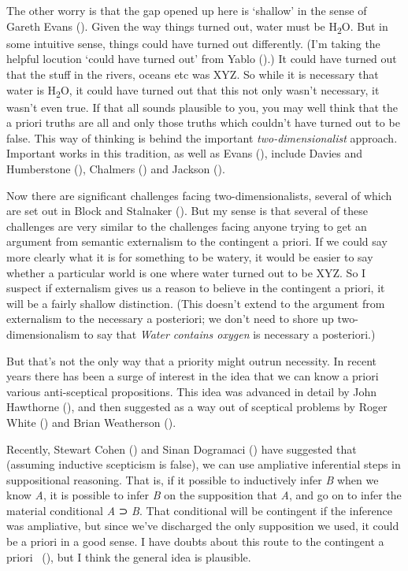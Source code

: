 \documentclass[
  10pt,
  letterpaper,
  DIV=11,
  numbers=noendperiod,
  twoside]{scrartcl}
\begin{document}
The other worry is that the gap opened up here is `shallow' in the sense
of Gareth Evans (). Given the way things
turned out, water must be H\textsubscript{2}O. But in some intuitive
sense, things could have turned out differently. (I'm taking the helpful
locution `could have turned out' from Yablo
().) It could have turned out that the
stuff in the rivers, oceans etc was XYZ. So while it is necessary that
water is H\textsubscript{2}O, it could have turned out that this not
only wasn't necessary, it wasn't even true. If that all sounds plausible
to you, you may well think that the a priori truths are all and only
those truths which couldn't have turned out to be false. This way of
thinking is behind the important \emph{two-dimensionalist} approach.
Important works in this tradition, as well as Evans
(), include Davies and Humberstone
(), Chalmers
() and Jackson
().

Now there are significant challenges facing two-dimensionalists, several
of which are set out in Block and Stalnaker
(). But my sense is that several of
these challenges are very similar to the challenges facing anyone trying
to get an argument from semantic externalism to the contingent a priori.
If we could say more clearly what it is for something to be watery, it
would be easier to say whether a particular world is one where water
turned out to be XYZ. So I suspect if externalism gives us a reason to
believe in the contingent a priori, it will be a fairly shallow
distinction. (This doesn't extend to the argument from externalism to
the necessary a posteriori; we don't need to shore up two-dimensionalism
to say that \emph{Water contains oxygen} is necessary a posteriori.)

But that's not the only way that a priority might outrun necessity. In
recent years there has been a surge of interest in the idea that we can
know a priori various anti-sceptical propositions. This idea was
advanced in detail by John Hawthorne
(), and then suggested as a way out of
sceptical problems by Roger White () and
Brian Weatherson ().

Recently, Stewart Cohen () and Sinan
Dogramaci () have suggested that
(assuming inductive scepticism is false), we can use ampliative
inferential steps in suppositional reasoning. That is, if it possible to
inductively infer \emph{B} when we know \emph{A}, it is possible to
infer \emph{B} on the supposition that \emph{A}, and go on to infer the
material conditional \emph{A} ⊃ \emph{B}. That conditional will be
contingent if the inference was ampliative, but since we've discharged
the only supposition we used, it could be a priori in a good sense. I
have doubts about this route to the contingent a priori
~(), but I think
the general idea is plausible.
\end{document}
